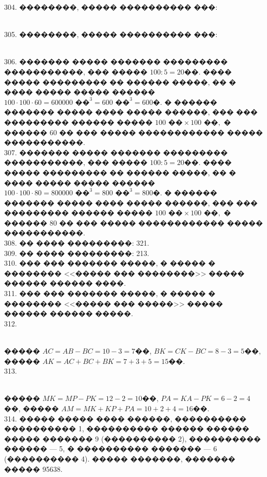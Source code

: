 \documentclass[12pt]{article}
\begin{document}
304. ��������, ����� ���������� ���:
\begin{figure}[ht!]
\end{figure}\\
305. ��������, ����� ���������� ���:
\begin{figure}[ht!]
\end{figure}\\
306. ������� ����� ������� ��������� �����������, ��� ����� $100:5=20$��. ���� ����� ��������� �� ������ �����, �� � ���� ����� ����� ������ $100\cdot100\cdot60=600000\text{ ��}^3=600\text{ ��}^3=600$�. � ������ ������� ����� ���� ����� ������, ��� ��� ��������� ������ ����� $100\text{ ��}\times100\text{ ��},$ � ������ 60 �� ��� ����� ������������ ����� �����������.\\
307. ������� ����� ������� ��������� �����������, ��� ����� $100:5=20$��. ���� ����� ��������� �� ������ �����, �� � ���� ����� ����� ������ $100\cdot100\cdot80=800000\text{ ��}^3=800\text{ ��}^3=800$�. � ������ ������� ����� ���� ����� ������, ��� ��� ��������� ������ ����� $100\text{ ��}\times100\text{ ��},$ � ������ 80 �� ��� ����� ������������ ����� �����������.\\
308. �� ���� ���������: 321.\\
309. �� ���� ���������: 213.\\
310. ��� ��� ������� �����, � ����� � �������� <<����� ��� ��������>> ����� ������ ������ ����.\\
311. ��� ��� ������� �����, � ����� � �������� <<����� ��� �����>> ����� ������ ������ �����.\\
312.\begin{figure}[ht!]
\end{figure}\\
����� $AC=AB-BC=10-3=7$��, $BK=CK-BC=8-3=5$��, ����� $AK=AC+BC+BK=7+3+5=15$��.\\
313. \begin{figure}[ht!]
\end{figure}\\
����� $MK=MP-PK=12-2=10$��, $PA=KA-PK=6-2=4$��, ����� $AM=MK+KP+PA=10+2+4=16$��.\\
314. ����� ����� ���� ������, ���������� ���������� 1, ���������� ������ ������ ����� ������� 9 (���������� 2), ���������� ������ --- 5, � ���������� ������� --- 6 (���������� 4). ����� �������, ������� ����� 95638.\\
\end{document}

